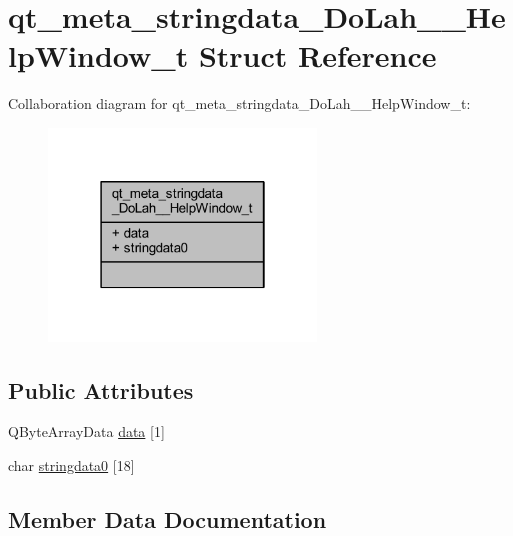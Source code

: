 \hypertarget{structqt__meta__stringdata___do_lah_____help_window__t}{}\section{qt\+\_\+meta\+\_\+stringdata\+\_\+\+Do\+Lah\+\_\+\+\_\+\+Help\+Window\+\_\+t Struct Reference}
\label{structqt__meta__stringdata___do_lah_____help_window__t}


Collaboration diagram for qt\+\_\+meta\+\_\+stringdata\+\_\+\+Do\+Lah\+\_\+\+\_\+\+Help\+Window\+\_\+t\+:\nopagebreak
\begin{figure}[H]
\begin{center}
\leavevmode
\includegraphics[width=202pt]{structqt__meta__stringdata___do_lah_____help_window__t__coll__graph}
\end{center}
\end{figure}
\subsection*{Public Attributes}
\begin{DoxyCompactItemize}
\item 
Q\+Byte\+Array\+Data \hyperlink{structqt__meta__stringdata___do_lah_____help_window__t_ac48a7bbd005a7023d0a83f8c19d12c02}{data} \mbox{[}1\mbox{]}
\item 
char \hyperlink{structqt__meta__stringdata___do_lah_____help_window__t_a8d675d0228428d8b89f5d524ffecd383}{stringdata0} \mbox{[}18\mbox{]}
\end{DoxyCompactItemize}


\subsection{Member Data Documentation}
\hypertarget{structqt__meta__stringdata___do_lah_____help_window__t_ac48a7bbd005a7023d0a83f8c19d12c02}{}
